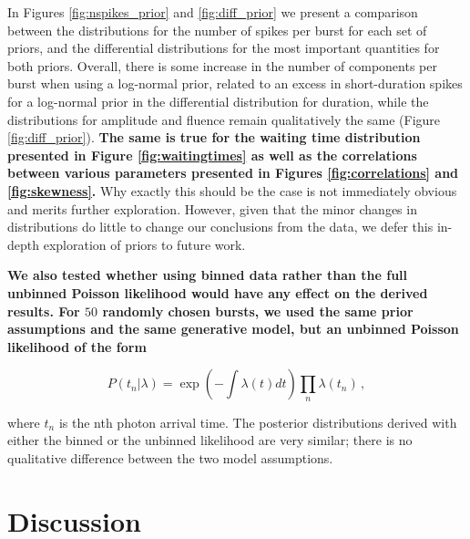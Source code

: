 \documentclass[12pt]{emulateapj}
\begin{document}
In Figures \ref{fig:nspikes_prior} and \ref{fig:diff_prior} we present a comparison between the distributions for the number of spikes 
per burst for each set of priors, and the differential distributions for the most important quantities for both priors.
Overall, there is some increase in the number of components per burst when using a log-normal prior, related to
an excess in short-duration spikes for a log-normal prior in the differential 
distribution for duration, while the distributions for amplitude and fluence remain qualitatively the same (Figure \ref{fig:diff_prior}). {\bf The same 
is true for the waiting time distribution presented in Figure \ref{fig:waitingtimes} as well as the correlations between various parameters 
presented in Figures \ref{fig:correlations} and \ref{fig:skewness}.} Why exactly this should be the case is not immediately 
obvious and merits further exploration. However, given that the minor changes in distributions do little to change our conclusions from the data, we defer this 
in-depth exploration of priors to future work.

{\bf We also tested whether using binned data rather than the full unbinned Poisson likelihood would have any effect on the derived results. For $50$ randomly chosen 
bursts, we used the same prior assumptions and the same generative model, but an unbinned Poisson likelihood of the form

\begin{equation}
P({t_n}|\lambda) = \exp(-\int \lambda(t) dt) \prod_n \lambda(t_n) \, ,
\end{equation}

where $t_n$ is the nth photon arrival time. The posterior distributions derived with either the binned or the unbinned likelihood are very similar; there is no qualitative difference between the two model assumptions.
}

\section{Discussion}
\label{ch6:discussion}
\end{document}
